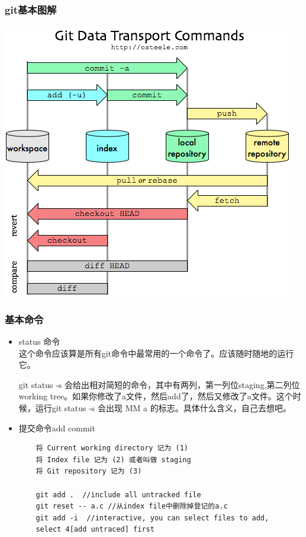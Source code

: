 \documentclass[a4paper,12pt,twoside]{book}
\begin{document}
\begin{CJK*}{UTF8}{song}
\subsubsection{git基本图解}
 \includegraphics[scale=0.8]{pics/git-transport} \\

\subsubsection{基本命令}
\begin{itemize}
\item status 命令 \\
    这个命令应该算是所有git命令中最常用的一个命令了。应该随时随地的运行它。\par
    git status -s 会给出相对简短的命令，其中有两列，第一列位staging,第二列位working tree。如果你修改了a文件，然后add了，然后又修改了a文件。这个时候，运行git status -s
    会出现 MM a 的标志。具体什么含义，自己去想吧。

\item 提交命令add commit
    \begin{verbatim}
    将 Current working directory 记为 (1)
    将 Index file 记为 (2) 或者叫做 staging
    将 Git repository 记为 (3)

    git add .  //include all untracked file
    git reset -- a.c //从index file中删除掉登记的a.c
    git add -i  //interactive, you can select files to add, 
    select 4[add untraced] first  
    

\end{verbatim}
\end{itemize}
\end{CJK*}
\end{document}
